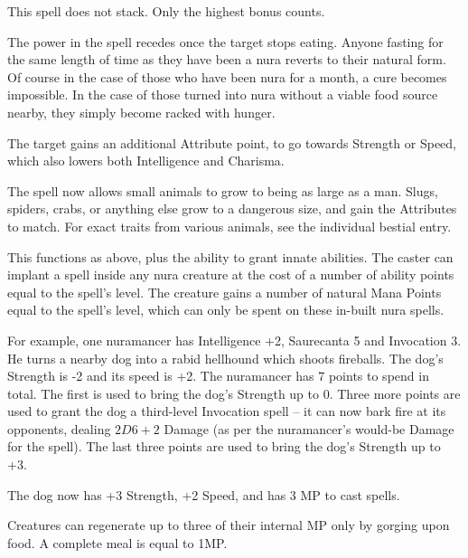\begin{multicols}{2}
This spell does not stack.
Only the highest bonus counts.

The power in the spell recedes once the target stops eating.
Anyone fasting for the same length of time as they have been a nura reverts to their natural form.
Of course in the case of those who have been nura for a month, a cure becomes impossible.
In the case of those turned into nura without a viable food source nearby, they simply become racked with hunger.
\label{nura_recovery}

The target gains an additional Attribute point, to go towards Strength or Speed, which also lowers both Intelligence and Charisma.


The spell now allows small animals to grow to being as large as a man.
Slugs, spiders, crabs, or anything else grow to a dangerous size, and gain the Attributes to match.
For exact traits from various animals, see the individual bestial entry.

\spelllevel
{}

This functions as above, plus the ability to grant innate abilities.  The caster can implant a spell inside any nura creature at the cost of a number of ability points equal to the spell's level.  The creature gains a number of natural Mana Points equal to the spell's level, which can only be spent on these in-built nura spells.

\begin{exampletext}

For example, one nuramancer has Intelligence +2, Saurecanta 5 and Invocation 3.
He turns a nearby dog into a rabid hellhound which shoots fireballs.
The dog's Strength is -2 and its speed is +2.
The nuramancer has 7 points to spend in total.
The first is used to bring the dog's Strength up to 0.
Three more points are used to grant the dog a third-level Invocation spell -- it can now bark fire at its opponents, dealing $2D6+2$ Damage (as per the nuramancer's would-be Damage for the spell).
The last three points are used to bring the dog's Strength up to +3.

The dog now has +3 Strength, +2 Speed, and has 3 MP to cast spells.

\end{exampletext}

Creatures can regenerate up to three of their internal MP only by gorging upon food.  A complete meal is equal to 1MP.

\end{multicols}

